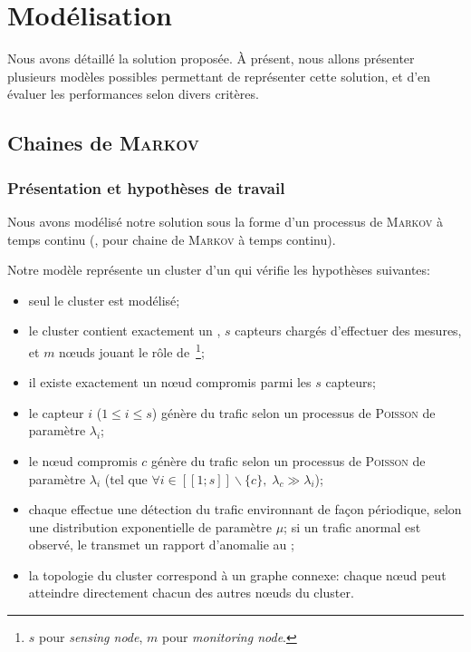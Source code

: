 \section{Modélisation}
\label{sa:sec:modelisation}

Nous avons détaillé la solution proposée. À présent, nous allons présenter plusieurs modèles possibles permettant de représenter cette solution, et d'en évaluer les performances selon divers critères.

    \subsection{Chaines de \textsc{Markov}}

        \subsubsection{Présentation et hypothèses de travail}
Nous avons modélisé notre solution sous la forme d'un processus de \textsc{Markov} à temps continu (\cmtc, pour chaine de \textsc{Markov} à temps continu).

Notre modèle représente un cluster d'un \rcsf qui vérifie les hypothèses suivantes:
\begin{itemize}
    \item seul le cluster est modélisé;
    \item le cluster contient exactement un \CH, $s$ capteurs chargés d'effectuer des mesures, et $m$ nœuds jouant le rôle de \cns\,\footnote{$s$ pour \textit{sensing node}, $m$ pour \textit{monitoring node}.};
    \item il existe exactement un nœud compromis parmi les $s$ capteurs;
    \item le capteur $i$ ($1 \leq i \leq s$) génère du trafic selon un processus de \textsc{Poisson} de paramètre $\lambda_i$;
    \item le nœud compromis $c$ génère du trafic selon un processus de \textsc{Poisson} de paramètre $\lambda_i$ (tel que $\forall i\in[\![1;s]\!]\backslash\{c\},\; \lambda_c\gg\lambda_i$);
    \item chaque \cn effectue une détection du trafic environnant de façon périodique, selon une distribution exponentielle de paramètre $\mu$; si un trafic anormal est observé, le \cn transmet un rapport d'anomalie au \CH;
    \item la topologie du cluster correspond à un graphe connexe: chaque nœud peut atteindre directement chacun des autres nœuds du cluster.
\end{itemize}

